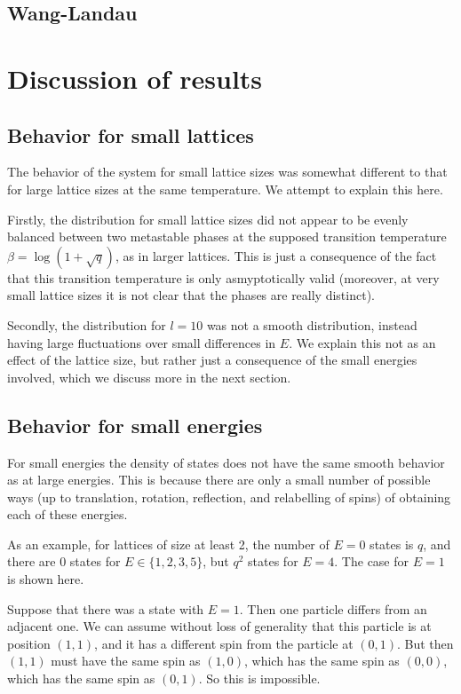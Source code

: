 \documentclass{article}
\begin{document}
\subsection{Wang-Landau}
\section{Discussion of results}
\subsection{Behavior for small lattices}
The behavior of the system for small lattice sizes was somewhat different to that for large lattice sizes at the same temperature.
We attempt to explain this here.

Firstly, the distribution for small lattice sizes did not appear to be evenly balanced between two metastable phases at the supposed transition temperature $\beta = \log(1+\sqrt q)$, as in larger lattices.
This is just a consequence of the fact that this transition temperature is only asmyptotically valid (moreover, at very small lattice sizes it is not clear that the phases are really distinct).

Secondly, the distribution for $l = 10$ was not a smooth distribution, instead having large fluctuations over small differences in $E$.
We explain this not as an effect of the lattice size, but rather just a consequence of the small energies involved, which we discuss more in the next section.

\subsection{Behavior for small energies}
For small energies the density of states does not have the same smooth behavior as at large energies.
This is because there are only a small number of possible ways (up to translation, rotation, reflection, and relabelling of spins) of obtaining each of these energies.

As an example, for lattices of size at least 2, the number of $E = 0$ states is $q$, and there are $0$ states for $E \in \{1,2,3,5\}$, but $q^2$ states for $E = 4$.
The case for $E = 1$ is shown here.

Suppose that there was a state with $E = 1$.
Then one particle differs from an adjacent one.
We can assume without loss of generality that this particle is at position $(1,1)$, and it has a different spin from the particle at $(0,1)$.
But then $(1,1)$ must have the same spin as $(1,0)$, which has the same spin as $(0,0)$, which has the same spin as $(0,1)$.
So this is impossible.
\end{document}
